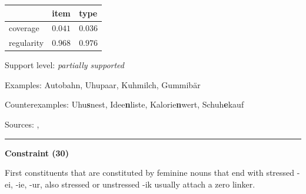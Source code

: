 \vspace{-0.25em}

\begin{table}[!ht]
\begin{center}
\setlength{\extrarowheight}{1pt}
\begin{tabularx}{\columnwidth}{|X|X|X|}
\hline
 & item & type \\
\hline
 coverage & $0.041$ & $0.036$ \\
\hline
 regularity & $0.968$ & $0.976$ \\
\hline
\end{tabularx}
\end{center}
\end{table}

\vspace{-1.35em}

\noindent
Support level: \textit{partially supported}

\vspace{0.3em}

\noindent
Examples: Auto{\zeroLinker}bahn, Uhu{\zeroLinker}paar, Kuh{\zeroLinker}milch, Gummi{\zeroLinker}bär

\noindent
Counterexamples: Uhu\textbf{s}nest, Idee\textbf{n}liste, Kalorie\textbf{n}wert, Schuh\textbf{e}kauf

\vspace{0.3em}

\noindent
Sources: \citet[110]{kuerschner_2005}, \citet[9]{schaefer_pankratz_2018}

\vspace{0.35em}
\hrule




\vspace{0.4em}

\begin{center}
\textbf{Constraint (30)}
\end{center}

\noindent
First constituents that are constituted by feminine nouns that end with stressed -ei, -ie, -ur, also stressed or unstressed -ik usually attach a zero linker.
\vspace{0.5em}


